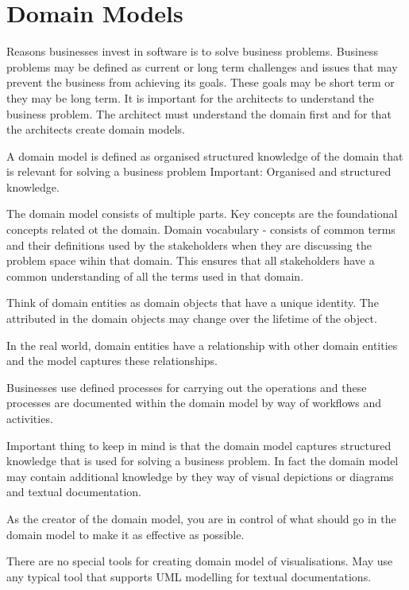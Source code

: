 \documentclass[a4paper, 11pt]{book}
\begin{document}
    \section{Domain Models}
    Reasons businesses invest in software is to solve business problems.
    Business problems may be defined as current or long term challenges and issues that may prevent the business from achieving its goals.
    These goals may be short term or they may be long term.
    It is important for the architects to understand the business problem.
    The architect must understand the domain first and for that the architects create domain models.


    A domain model is defined as organised structured knowledge of the domain that is relevant for solving a business problem
    Important: Organised and structured knowledge.

    The domain model consists of multiple parts.
    Key concepts are the foundational concepts related ot the domain.
    Domain vocabulary - consists of common terms and their definitions used by the stakeholders when they are discussing the problem space wihin that domain.
    This ensures that all stakeholders have a common understanding of all the terms used in that domain.

    Think of domain entities as domain objects that have a unique identity.
    The attributed in the domain objects may change over the lifetime of the object.

    In the real world, domain entities have a relationship with other domain entities and the model captures these relationships.

    Businesses use defined processes for carrying out the operations and these processes are documented within the domain model by way of workflows and activities.

    Important thing to keep in mind is that the domain model captures structured knowledge that is used for solving a business problem.
    In fact the domain model may contain additional knowledge by they way of visual depictions or diagrams and textual documentation.

    As the creator of the domain model, you are in control of what should go in the domain model to make it as effective as possible.

    There are no special tools for creating domain model of visualisations.
    May use any typical tool that supports UML modelling for textual documentations.
\end{document}
